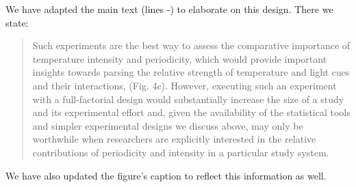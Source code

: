 \documentclass[11pt]{article}
\begin{document}
 We have adapted the main text (lines -) to elaborate on this design. There we state:
 \begin{quote}Such experiments are the best way to assess the comparative importance of temperature intensity and periodicity, which would provide important insights towards parsing the relative strength of temperature and light cues and their interactions,  (Fig. 4c). However, executing such an experiment with a full-factorial design would substantially increase the size of a study and its experimental effort and, given the availability of the statistical tools and simpler experimental designs we discuss above, may only be worthwhile when researchers are explicitly interested in the relative contributions of periodicity and intensity in a particular study system.\end{quote}
We have also updated the figure's caption to reflect this information as well.
\end{document}
